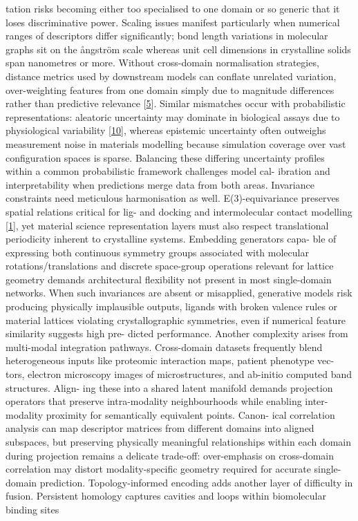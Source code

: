 \documentclass[
]{article}
\begin{document}
tation risks becoming either too specialised to one domain or so generic
that it loses discriminative power. Scaling issues manifest particularly
when numerical ranges of descriptors differ significantly; bond length
variations in molecular graphs sit on the ångström scale whereas unit
cell dimensions in crystalline solids span nanometres or more. Without
cross-domain normalisation strategies, distance metrics used by
downstream models can conflate unrelated variation, over-weighting
features from one domain simply due to magnitude differences rather than
predictive relevance {[}\protect\hyperlink{_bookmark45}{5}{]}. Similar
mismatches occur with probabilistic representations: aleatoric
uncertainty may dominate in biological assays due to physiological
variability {[}\protect\hyperlink{_bookmark50}{10}{]}, whereas epistemic
uncertainty often outweighs measurement noise in materials modelling
because simulation coverage over vast configuration spaces is sparse.
Balancing these differing uncertainty profiles within a common
probabilistic framework challenges model cal- ibration and
interpretability when predictions merge data from both areas. Invariance
constraints need meticulous harmonisation as well. E(3)-equivariance
preserves spatial relations critical for lig- and docking and
intermolecular contact modelling
{[}\protect\hyperlink{_bookmark41}{1}{]}, yet material science
representation layers must also respect translational periodicity
inherent to crystalline systems. Embedding generators capa- ble of
expressing both continuous symmetry groups associated with molecular
rotations/translations and discrete space-group operations relevant for
lattice geometry demands architectural flexibility not present in most
single-domain networks. When such invariances are absent or misapplied,
generative models risk producing physically implausible outputs, ligands
with broken valence rules or material lattices violating
crystallographic symmetries, even if numerical feature similarity
suggests high pre- dicted performance. Another complexity arises from
multi-modal integration pathways. Cross-domain datasets frequently blend
heterogeneous inputs like proteomic interaction maps, patient phenotype
vec- tors, electron microscopy images of microstructures, and ab-initio
computed band structures. Align- ing these into a shared latent manifold
demands projection operators that preserve intra-modality neighbourhoods
while enabling inter-modality proximity for semantically equivalent
points. Canon- ical correlation analysis can map descriptor matrices
from different domains into aligned subspaces, but preserving physically
meaningful relationships within each domain during projection remains a
delicate trade-off: over-emphasis on cross-domain correlation may
distort modality-specific geometry required for accurate single-domain
prediction. Topology-informed encoding adds another layer of difficulty
in fusion. Persistent homology captures cavities and loops within
biomolecular binding sites
\end{document}
